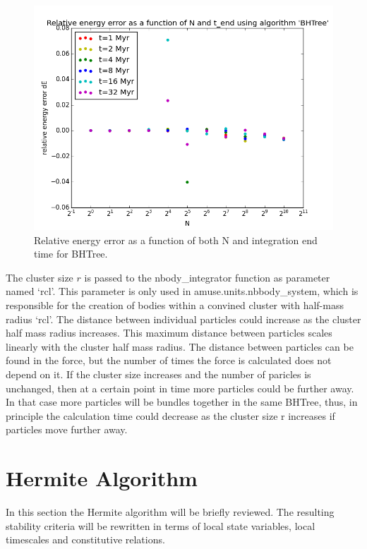 \documentclass{aa}
\begin{document}
   \begin{figure}
   \centering
   \includegraphics[width=\hsize]{../GravitationalDynamics/plots/CA_GD_TLRH_s1603221_SS_s1617451_BHTree_dE.png}
      \caption{Relative energy error as a function of both N and integration 
               end time for BHTree.
              }
         \label{fig:BHTree_dE}
   \end{figure}

The cluster size $r$ is passed to the nbody\_integrator function as parameter
named `rcl'. This parameter is only used in amuse.units.nbbody\_system, which is
responsible for the creation of bodies within a convined cluster with half-mass
radius `rcl'. The distance between individual particles could increase  as the
cluster half mass radius increases. This maximum distance between particles
scales linearly with the cluster half mass radius. The distance between
particles can be found in the force, but the number of times the force is
calculated does not depend on it. If the cluster size increases and the number
of paricles is unchanged, then at a certain point in time more particles could
be further away. In that case more particles will be bundles together in the
same BHTree, thus, in principle the calculation time could decrease as the
cluster size r increases if particles move further away. 


\section{Hermite Algorithm}
   In this section the Hermite algorithm \citep{1995ApJ...443L..93H} will
   be briefly reviewed. The resulting stability criteria will be
   rewritten in terms of local state variables, local timescales and
   constitutive relations.
   
\end{document}
